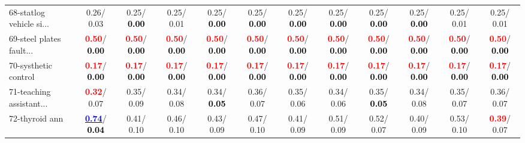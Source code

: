 \begin{table}[h]
\begin{center}
{\begin{tabular}{lc|c|c|c|c|c|c|c|c|c|c}
68-statlog vehicle si... &   0.26/  0.03 &   0.25/\textcolor{black}{\textbf{  0.00}} &   0.25/  0.01 &   0.25/\textcolor{black}{\textbf{  0.00}} &   0.25/\textcolor{black}{\textbf{  0.00}} &   0.25/\textcolor{black}{\textbf{  0.00}} &   0.25/\textcolor{black}{\textbf{  0.00}} &   0.25/\textcolor{black}{\textbf{  0.00}} &   0.25/\textcolor{black}{\textbf{  0.00}} &   0.25/  0.01 &   0.25/  0.01 \\
69-steel plates fault... & \textcolor{red}{\textbf{  0.50}}/\textcolor{black}{\textbf{  0.00}} & \textcolor{red}{\textbf{  0.50}}/\textcolor{black}{\textbf{  0.00}} & \textcolor{red}{\textbf{  0.50}}/\textcolor{black}{\textbf{  0.00}} & \textcolor{red}{\textbf{  0.50}}/\textcolor{black}{\textbf{  0.00}} & \textcolor{red}{\textbf{  0.50}}/\textcolor{black}{\textbf{  0.00}} & \textcolor{red}{\textbf{  0.50}}/\textcolor{black}{\textbf{  0.00}} & \textcolor{red}{\textbf{  0.50}}/\textcolor{black}{\textbf{  0.00}} & \textcolor{red}{\textbf{  0.50}}/\textcolor{black}{\textbf{  0.00}} & \textcolor{red}{\textbf{  0.50}}/\textcolor{black}{\textbf{  0.00}} & \textcolor{red}{\textbf{  0.50}}/\textcolor{black}{\textbf{  0.00}} & \textcolor{red}{\textbf{  0.50}}/\textcolor{black}{\textbf{  0.00}} \\
70-systhetic control & \textcolor{red}{\textbf{  0.17}}/\textcolor{black}{\textbf{  0.00}} & \textcolor{red}{\textbf{  0.17}}/\textcolor{black}{\textbf{  0.00}} & \textcolor{red}{\textbf{  0.17}}/\textcolor{black}{\textbf{  0.00}} & \textcolor{red}{\textbf{  0.17}}/\textcolor{black}{\textbf{  0.00}} & \textcolor{red}{\textbf{  0.17}}/\textcolor{black}{\textbf{  0.00}} & \textcolor{red}{\textbf{  0.17}}/\textcolor{black}{\textbf{  0.00}} & \textcolor{red}{\textbf{  0.17}}/\textcolor{black}{\textbf{  0.00}} & \textcolor{red}{\textbf{  0.17}}/\textcolor{black}{\textbf{  0.00}} & \textcolor{red}{\textbf{  0.17}}/\textcolor{black}{\textbf{  0.00}} & \textcolor{red}{\textbf{  0.17}}/\textcolor{black}{\textbf{  0.00}} & \textcolor{red}{\textbf{  0.17}}/\textcolor{black}{\textbf{  0.00}} \\
71-teaching assistant... & \textcolor{red}{\textbf{  0.32}}/  0.07 &   0.35/  0.09 &   0.34/  0.08 &   0.34/\textcolor{black}{\textbf{  0.05}} &   0.36/  0.07 &   0.35/  0.06 &   0.34/  0.06 &   0.35/\textcolor{black}{\textbf{  0.05}} &   0.34/  0.08 &   0.35/  0.07 &   0.36/  0.07 \\ \hline
72-thyroid ann & \underline{\textcolor{blue}{\textbf{  0.74}}}/\textcolor{black}{\textbf{  0.04}} &   0.41/  0.10 &   0.46/  0.10 &   0.43/  0.09 &   0.47/  0.10 &   0.41/  0.09 &   0.51/  0.09 &   0.52/  0.07 &   0.40/  0.09 &   0.53/  0.10 & \textcolor{red}{\textbf{  0.39}}/  0.07 \\

\end{tabular}}
\end{center}
\end{table}
